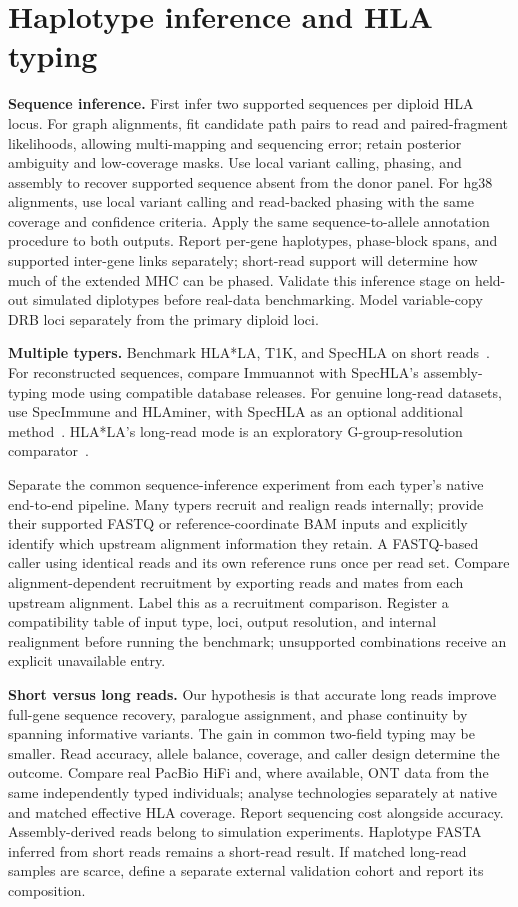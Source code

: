 \documentclass[10pt,a4paper]{article}
\begin{document}
\section{Haplotype inference and HLA typing}
\textbf{Sequence inference.}
First infer two supported sequences per diploid HLA locus. For graph alignments,
fit candidate path pairs to read and paired-fragment likelihoods, allowing
multi-mapping and sequencing error; retain posterior ambiguity and low-coverage
masks. Use local variant calling, phasing, and assembly to recover supported
sequence absent from the donor panel. For hg38 alignments, use local variant
calling and read-backed phasing with the same coverage and confidence criteria.
Apply the same sequence-to-allele annotation procedure to both outputs. Report
per-gene haplotypes, phase-block spans, and supported inter-gene links separately;
short-read support will determine how much of the extended MHC can be phased.
Validate this inference stage on held-out simulated diplotypes before real-data
benchmarking. Model variable-copy DRB loci separately from the primary diploid
loci.

\textbf{Multiple typers.}
Benchmark HLA*LA, T1K, and SpecHLA on short reads~\cite{hlala,t1k,spechla}.
For reconstructed sequences, compare Immuannot with SpecHLA's assembly-typing
mode using compatible database releases. For genuine long-read datasets, use
SpecImmune and HLAminer, with SpecHLA as an optional additional method~\cite{specimmune,hlaminer}.
HLA*LA's long-read mode is an exploratory G-group-resolution comparator~\cite{hlala}.

Separate the common sequence-inference experiment from each typer's native
end-to-end pipeline. Many typers recruit and realign reads internally; provide
their supported FASTQ or reference-coordinate BAM inputs and explicitly identify
which upstream alignment information they retain. A FASTQ-based caller using
identical reads and its own reference runs once per read set. Compare
alignment-dependent recruitment by exporting reads and mates from each upstream
alignment. Label this as a recruitment comparison. Register a compatibility table
of input type, loci, output resolution, and internal realignment before running
the benchmark; unsupported combinations receive an explicit unavailable entry.

\textbf{Short versus long reads.}
Our hypothesis is that accurate long reads improve full-gene sequence recovery,
paralogue assignment, and phase continuity by spanning informative variants.
The gain in common two-field typing may be smaller. Read accuracy, allele balance,
coverage, and caller design determine the outcome. Compare real PacBio HiFi and,
where available, ONT data from the same independently typed individuals; analyse
technologies separately at native and matched effective HLA coverage. Report
sequencing cost alongside accuracy. Assembly-derived reads belong to simulation
experiments. Haplotype FASTA inferred from short reads remains a short-read
result. If matched long-read samples are scarce, define a separate external
validation cohort and report its composition.
\end{document}
